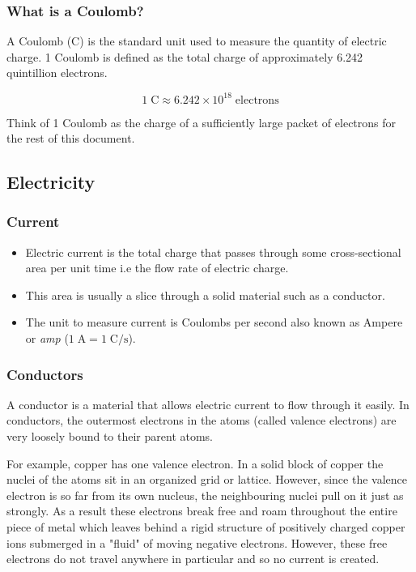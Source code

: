 \documentclass{article}
\begin{document}
\subsubsection{What is a Coulomb?}

A Coulomb (C) is the standard unit used to measure the quantity of electric charge. 1 Coulomb is defined as the total charge of approximately 6.242 quintillion electrons.

$$1 \; \mathrm{C} \approx 6.242 \times 10^{18} \; \mathrm{electrons}$$

Think of 1 Coulomb as the charge of a sufficiently large packet of electrons for the rest of this document.

\subsection{Electricity}

\subsubsection{Current}

\begin{itemize}
    \item Electric current is the total charge that passes through some cross-sectional area per unit time i.e the flow rate of electric charge.
    \item This area is usually a slice through a solid material such as a conductor.
    \item The unit to measure current is Coulombs per second also known as Ampere or \emph{amp} ($1 \; \mathrm{A} = 1 \; \mathrm{C/s}$).
\end{itemize}

\subsubsection{Conductors}

A conductor is a material that allows electric current to flow through it easily. In conductors, the outermost electrons in the atoms (called valence electrons) are very loosely bound to their parent atoms.

For example, copper has one valence electron. In a solid block of copper the nuclei of the atoms sit in an organized grid or lattice. However, since the valence electron is so far from its own nucleus, the neighbouring nuclei pull on it just as strongly. As a result these electrons break free and roam throughout the entire piece of metal which leaves behind a rigid structure of positively charged copper ions submerged in a "fluid" of moving negative electrons. However, these free electrons do not travel anywhere in particular and so no current is created.
\end{document}
